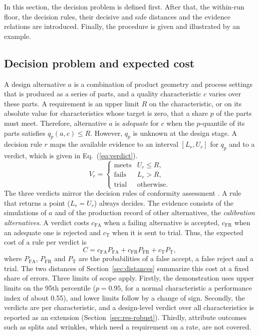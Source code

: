 \documentclass[pdflatex,sn-basic,lineno]{sn-jnl}
\begin{document}
In this section, the decision problem is defined first. After that, the within-run floor, the decision rules, their decisive and safe distances and the evidence relations are introduced. Finally, the procedure is given and illustrated by an example.

\subsection{Decision problem and expected cost}\label{sec:problem}

A design alternative $a$ is a combination of product geometry and process settings that is produced as a series of parts, and a quality characteristic $c$ varies over these parts. A requirement is an upper limit $R$ on the characteristic, or on its absolute value for characteristics whose target is zero, that a share $p$ of the parts must meet. Therefore, alternative $a$ is \emph{adequate} for $c$ when the $p$-quantile of its parts satisfies $q_p(a,c)\le R$. However, $q_p$ is unknown at the design stage. A decision rule $r$ maps the available evidence to an interval $[L_r, U_r]$ for $q_p$ and to a verdict, which is given in Eq.~(\ref{eq:verdict}).
\begin{equation}
V_r = \begin{cases} \text{meets} & U_r \le R,\\ \text{fails} & L_r > R,\\ \text{trial} & \text{otherwise.} \end{cases}
\label{eq:verdict}
\end{equation}
The three verdicts mirror the decision rules of conformity assessment \citep{iso2017decision}. A rule that returns a point ($L_r=U_r$) always decides. The evidence consists of the simulations of $a$ and of the production record of other alternatives, the \emph{calibration alternatives}. A verdict costs $c_\mathrm{FA}$ when a failing alternative is accepted, $c_\mathrm{FR}$ when an adequate one is rejected and $c_\mathrm{T}$ when it is sent to trial. Thus, the expected cost of a rule per verdict is
\begin{equation}
C = c_\mathrm{FA}P_\mathrm{FA} + c_\mathrm{FR}P_\mathrm{FR} + c_\mathrm{T}P_\mathrm{T},
\label{eq:cost}
\end{equation}
where $P_\mathrm{FA}$, $P_\mathrm{FR}$ and $P_\mathrm{T}$ are the probabilities of a false accept, a false reject and a trial. The two distances of Section~\ref{sec:distances} summarize this cost at a fixed share of errors. Three limits of scope apply. Firstly, the demonstration uses upper limits on the 95th percentile ($p=0.95$, for a normal characteristic a performance index of about 0.55), and lower limits follow by a change of sign. Secondly, the verdicts are per characteristic, and a design-level verdict over all characteristics is reported as an extension (Section~\ref{sec:res-robust}). Thirdly, attribute outcomes such as splits and wrinkles, which need a requirement on a rate, are not covered.
\end{document}
